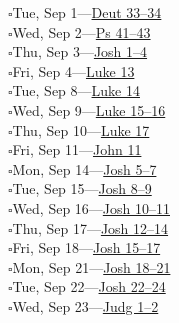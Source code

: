 \hypertarget{rp-2026-09-01}{}\noindent$\square$\enspace Tue, Sep 1\enspace---\enspace \hyperlink{ch-deuteronomy-33}{Deut 33--34}\\
\hypertarget{rp-2026-09-02}{}\noindent$\square$\enspace Wed, Sep 2\enspace---\enspace \hyperlink{ch-psalms-41}{Ps 41--43}\\
\hypertarget{rp-2026-09-03}{}\noindent$\square$\enspace Thu, Sep 3\enspace---\enspace \hyperlink{ch-joshua-1}{Josh 1--4}\\
\hypertarget{rp-2026-09-04}{}\noindent$\square$\enspace Fri, Sep 4\enspace---\enspace \hyperlink{ch-luke-13}{Luke 13}\\
\hypertarget{rp-2026-09-08}{}\noindent$\square$\enspace Tue, Sep 8\enspace---\enspace \hyperlink{ch-luke-14}{Luke 14}\\
\hypertarget{rp-2026-09-09}{}\noindent$\square$\enspace Wed, Sep 9\enspace---\enspace \hyperlink{ch-luke-15}{Luke 15--16}\\
\hypertarget{rp-2026-09-10}{}\noindent$\square$\enspace Thu, Sep 10\enspace---\enspace \hyperlink{ch-luke-17}{Luke 17}\\
\hypertarget{rp-2026-09-11}{}\noindent$\square$\enspace Fri, Sep 11\enspace---\enspace \hyperlink{ch-john-11}{John 11}\\
\hypertarget{rp-2026-09-14}{}\noindent$\square$\enspace Mon, Sep 14\enspace---\enspace \hyperlink{ch-joshua-5}{Josh 5--7}\\
\hypertarget{rp-2026-09-15}{}\noindent$\square$\enspace Tue, Sep 15\enspace---\enspace \hyperlink{ch-joshua-8}{Josh 8--9}\\
\hypertarget{rp-2026-09-16}{}\noindent$\square$\enspace Wed, Sep 16\enspace---\enspace \hyperlink{ch-joshua-10}{Josh 10--11}\\
\hypertarget{rp-2026-09-17}{}\noindent$\square$\enspace Thu, Sep 17\enspace---\enspace \hyperlink{ch-joshua-12}{Josh 12--14}\\
\hypertarget{rp-2026-09-18}{}\noindent$\square$\enspace Fri, Sep 18\enspace---\enspace \hyperlink{ch-joshua-15}{Josh 15--17}\\
\hypertarget{rp-2026-09-21}{}\noindent$\square$\enspace Mon, Sep 21\enspace---\enspace \hyperlink{ch-joshua-18}{Josh 18--21}\\
\hypertarget{rp-2026-09-22}{}\noindent$\square$\enspace Tue, Sep 22\enspace---\enspace \hyperlink{ch-joshua-22}{Josh 22--24}\\
\hypertarget{rp-2026-09-23}{}\noindent$\square$\enspace Wed, Sep 23\enspace---\enspace \hyperlink{ch-judges-1}{Judg 1--2}\\
